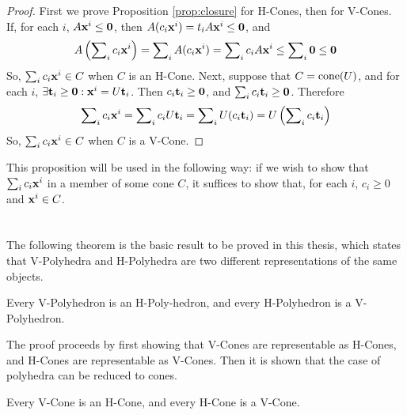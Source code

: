 \begin{proof}
  First we prove Proposition \ref{prop:closure} for H-Cones, then for V-Cones.
  If, for each $i$, $A\mathbf{x}^i \leq \mathbf{0}$, then $A(c_i\mathbf{x}^i) = t_iA\mathbf{x}^i \leq \mathbf{0}$, and
  \[ A\left(\sum\nolimits_i c_i\mathbf{x}^i\right) = \sum\nolimits_i A (c_i\mathbf{x}^i) = 
            \sum\nolimits_i c_i A\mathbf{x}^i \leq \sum\nolimits_i \mathbf{0} \leq \mathbf{0} \]
  So, $\sum\nolimits_i c_i\mathbf{x}^i \in C$ when $C$ is an H-Cone.  Next, suppose that $C = \operatorname{cone}(U)$, and for each $i$, $\exists \mathbf{t}_i \geq \mathbf{0}: \mathbf{x}^i = U\mathbf{t}_i$.  Then $c_i\mathbf{t}_i \geq \mathbf{0}$, and $\sum\nolimits_i c_i\mathbf{t}_i \geq \mathbf{0}$.  Therefore
  \[ \sum\nolimits_i c_i\mathbf{x}^i = \sum\nolimits_i c_i U\mathbf{t}_i = \sum\nolimits_i U(c_i\mathbf{t}_i) 
                   = U\left(\sum\nolimits_i c_i\mathbf{t}_i\right) \]
  So, $\sum\nolimits_i c_i\mathbf{x}^i \in C$ when $C$ is a V-Cone.
\end{proof}

This proposition will be used in the following way: if we wish to show that $\sum\nolimits_i c_i\mathbf{x}^i$ in a member of some cone $C$, it suffices to show that, for each $i$, $c_i \geq 0$ and $\mathbf{x}^i \in C$.


\section{\MWT}

The following theorem is the basic result to be proved in this thesis, which states that V-Polyhedra and H-Polyhedra are two different representations of the same objects.

\begin{Thm}[{\MWT}]{
  Every V-Polyhedron is an H-Poly-hedron, and every H-Polyhedron is a V-Polyhedron.
}\end{Thm}

The proof proceeds by first showing that V-Cones are representable as H-Cones, and H-Cones are representable as V-Cones.  Then it is shown that the case of polyhedra can be reduced to cones.

\begin{Thm}{
  Every V-Cone is an H-Cone, and every H-Cone is a V-Cone.
}\end{Thm}

